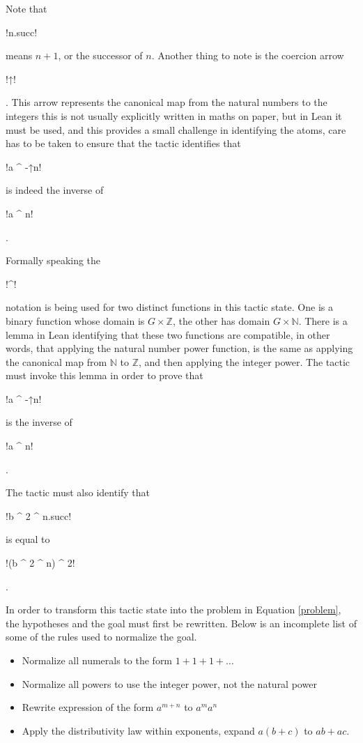 \documentclass[12pt]{article} %
\theoremstyle{definition}
\theoremstyle{definition}
\theoremstyle{definition}
\theoremstyle{definition}
\begin{document}
Note that \begin{lstinline} !n.succ! \end{lstinline} means $n + 1$, or the
successor of $n$. Another thing to note is the coercion arrow
\begin{lstinline} !↑! \end{lstinline}. This arrow represents the canonical map
from the natural numbers to the integers this is not usually explicitly
written in maths on paper, but in Lean it must be used,
and this provides a small challenge in
identifying the atoms, care has to be taken to ensure that the tactic identifies
that
\begin{lstinline} !a ^ -↑n! \end{lstinline} is indeed the inverse of
\begin{lstinline} !a ^ n! \end{lstinline}.

Formally speaking the \begin{lstinline} !^! \end{lstinline} notation
is being used for two distinct functions in this tactic state. One
is a binary function whose domain is $G \times \mathbb{Z}$,
the other has domain $G \times \mathbb{N}$. There is a lemma in Lean
identifying that these two functions are compatible, in other words,
that applying the natural number power function, is the same as
applying the canonical map from $\mathbb{N}$ to $\mathbb{Z}$, and then
applying the integer power. The tactic must invoke this lemma in order to prove
that \begin{lstinline} !a ^ -↑n! \end{lstinline} is the inverse of
\begin{lstinline} !a ^ n! \end{lstinline}.

The tactic must also identify that \begin{lstinline} !b ^ 2 ^ n.succ! \end{lstinline}
is equal to \begin{lstinline} !(b ^ 2 ^ n) ^ 2! \end{lstinline}.

In order to transform this tactic state into the problem in Equation \ref{problem},
the hypotheses and the goal must first be rewritten. Below is an incomplete list of some
of the rules used to normalize the goal.

\begin{itemize}
  \item Normalize all numerals to the form
    $1 + 1 + 1 + \dots$
  \item Normalize all powers to use the integer power, not the natural power
  \item Rewrite expression of the form $a ^ {m + n}$ to $a^m a^n$
  \item Apply the distributivity law within exponents, expand
    $a(b+c)$ to $ab + ac$.
\end{itemize}
\end{document}

